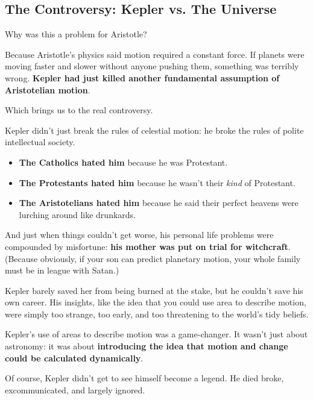\subsection{The Controversy: Kepler vs. The Universe}

Why was this a problem for Aristotle?

Because Aristotle’s physics said motion required a constant force. If planets were moving faster and slower without anyone pushing them, something was terribly wrong. \textbf{Kepler had just killed another fundamental assumption of Aristotelian motion}.

Which brings us to the real controversy.

Kepler didn’t just break the rules of celestial motion: he broke the rules of polite intellectual society.

\begin{itemize} 
	\item \textbf{The Catholics hated him} because he was Protestant. 
	\item \textbf{The Protestants hated him} because he wasn’t their \textit{kind} of Protestant. 
	\item \textbf{The Aristotelians hated him} because he said their perfect heavens were lurching around like drunkards. 
\end{itemize}

And just when things couldn’t get worse, his personal life problems were compounded by misfortune: \textbf{his mother was put on trial for witchcraft}. (Because obviously, if your son can predict planetary motion, your whole family must be in league with Satan.)

Kepler barely saved her from being burned at the stake, but he couldn’t save his own career. His insights, like the idea that you could use area to describe motion, were simply too strange, too early, and too threatening to the world’s tidy beliefs.

Kepler’s use of areas to describe motion was a game-changer. It wasn’t just about astronomy: it was about \textbf{introducing the idea that motion and change could be calculated dynamically}.

Of course, Kepler didn’t get to see himself become a legend. He died broke, excommunicated, and largely ignored. 




